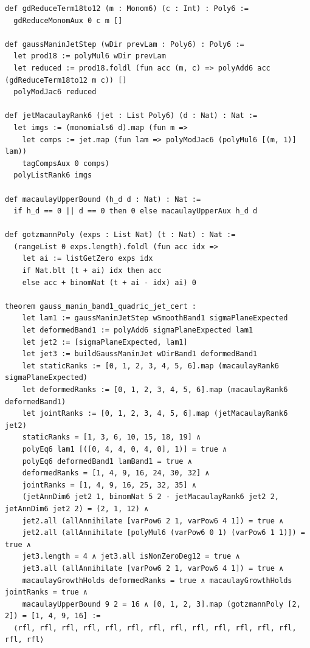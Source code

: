 \documentclass[11pt,a4paper]{article}
\begin{document}
\begin{lstlisting}[caption={3-band Gauss--Manin jet transport and Gotzmann persistence in \texttt{GaussManinJetTransport.lean}.}]
def gdReduceTerm18to12 (m : Monom6) (c : Int) : Poly6 :=
  gdReduceMonomAux 0 c m []

def gaussManinJetStep (wDir prevLam : Poly6) : Poly6 :=
  let prod18 := polyMul6 wDir prevLam
  let reduced := prod18.foldl (fun acc (m, c) => polyAdd6 acc (gdReduceTerm18to12 m c)) []
  polyModJac6 reduced

def jetMacaulayRank6 (jet : List Poly6) (d : Nat) : Nat :=
  let imgs := (monomials6 d).map (fun m =>
    let comps := jet.map (fun lam => polyModJac6 (polyMul6 [(m, 1)] lam))
    tagCompsAux 0 comps)
  polyListRank6 imgs

def macaulayUpperBound (h_d d : Nat) : Nat :=
  if h_d == 0 || d == 0 then 0 else macaulayUpperAux h_d d

def gotzmannPoly (exps : List Nat) (t : Nat) : Nat :=
  (rangeList 0 exps.length).foldl (fun acc idx =>
    let ai := listGetZero exps idx
    if Nat.blt (t + ai) idx then acc
    else acc + binomNat (t + ai - idx) ai) 0

theorem gauss_manin_band1_quadric_jet_cert :
    let lam1 := gaussManinJetStep wSmoothBand1 sigmaPlaneExpected
    let deformedBand1 := polyAdd6 sigmaPlaneExpected lam1
    let jet2 := [sigmaPlaneExpected, lam1]
    let jet3 := buildGaussManinJet wDirBand1 deformedBand1
    let staticRanks := [0, 1, 2, 3, 4, 5, 6].map (macaulayRank6 sigmaPlaneExpected)
    let deformedRanks := [0, 1, 2, 3, 4, 5, 6].map (macaulayRank6 deformedBand1)
    let jointRanks := [0, 1, 2, 3, 4, 5, 6].map (jetMacaulayRank6 jet2)
    staticRanks = [1, 3, 6, 10, 15, 18, 19] ∧
    polyEq6 lam1 [([0, 4, 4, 0, 4, 0], 1)] = true ∧
    polyEq6 deformedBand1 lamBand1 = true ∧
    deformedRanks = [1, 4, 9, 16, 24, 30, 32] ∧
    jointRanks = [1, 4, 9, 16, 25, 32, 35] ∧
    (jetAnnDim6 jet2 1, binomNat 5 2 - jetMacaulayRank6 jet2 2, jetAnnDim6 jet2 2) = (2, 1, 12) ∧
    jet2.all (allAnnihilate [varPow6 2 1, varPow6 4 1]) = true ∧
    jet2.all (allAnnihilate [polyMul6 (varPow6 0 1) (varPow6 1 1)]) = true ∧
    jet3.length = 4 ∧ jet3.all isNonZeroDeg12 = true ∧
    jet3.all (allAnnihilate [varPow6 2 1, varPow6 4 1]) = true ∧
    macaulayGrowthHolds deformedRanks = true ∧ macaulayGrowthHolds jointRanks = true ∧
    macaulayUpperBound 9 2 = 16 ∧ [0, 1, 2, 3].map (gotzmannPoly [2, 2]) = [1, 4, 9, 16] :=
  ⟨rfl, rfl, rfl, rfl, rfl, rfl, rfl, rfl, rfl, rfl, rfl, rfl, rfl, rfl, rfl⟩


\end{lstlisting}
\end{document}
